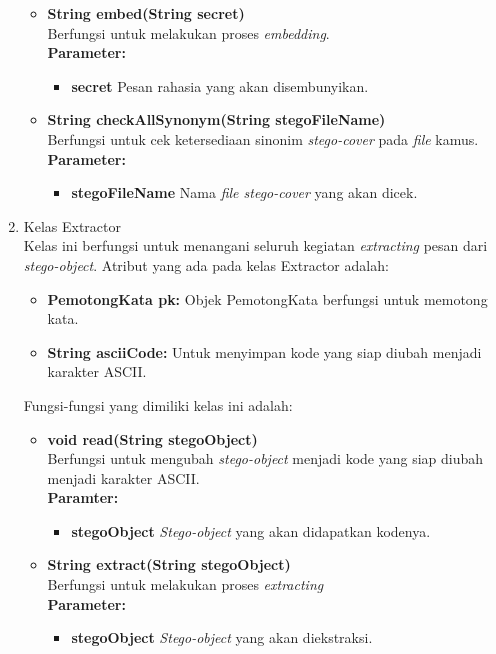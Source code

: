 \begin{enumerate}
\begin{itemize}
		\item \textbf{String embed(String secret)}\\
		Berfungsi untuk melakukan proses \textit{embedding}.\\
		\textbf{Parameter:}
		\begin{itemize}
			\item \textbf{secret} Pesan rahasia yang akan disembunyikan.
		\end{itemize}
		
		\item \textbf{String checkAllSynonym(String stegoFileName)}\\
		Berfungsi untuk cek ketersediaan sinonim \textit{stego-cover} pada \textit{file} kamus.\\
		\textbf{Parameter:}
		\begin{itemize}
			\item \textbf{stegoFileName} Nama \textit{file stego-cover} yang akan dicek.
		\end{itemize}
	\end{itemize}
	
	\item Kelas Extractor\\
	Kelas ini berfungsi untuk menangani seluruh kegiatan \textit{extracting} pesan dari \textit{stego-object}. Atribut yang ada pada kelas Extractor adalah:
	\begin{itemize}
		\item \textbf{PemotongKata pk:} Objek PemotongKata berfungsi untuk memotong kata.
		\item \textbf{String asciiCode:} Untuk menyimpan kode yang siap diubah menjadi karakter ASCII.
	\end{itemize}
	
	Fungsi-fungsi yang dimiliki kelas ini adalah:
	
	\begin{itemize}
		\item \textbf{void read(String stegoObject)}\\
		Berfungsi untuk mengubah \textit{stego-object} menjadi kode yang siap diubah menjadi karakter ASCII.\\
		\textbf{Paramter:}
		\begin{itemize}
			\item \textbf{stegoObject} \textit{Stego-object} yang akan didapatkan kodenya.
		\end{itemize}
		
		\item \textbf{String extract(String stegoObject)}\\
		Berfungsi untuk melakukan proses \textit{extracting}\\
		\textbf{Parameter:}
		\begin{itemize}
			\item \textbf{stegoObject} \textit{Stego-object} yang akan diekstraksi.
		\end{itemize}
	\end{itemize}
	
\end{enumerate}


